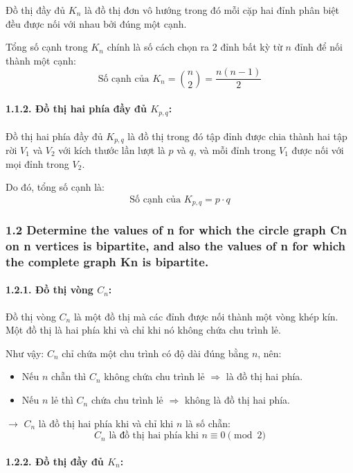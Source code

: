\documentclass{article}
\begin{document}
	Đồ thị đầy đủ \( K_n \) là đồ thị đơn vô hướng trong đó mỗi cặp hai đỉnh phân biệt đều được nối với nhau bởi đúng một cạnh.
	
	Tổng số cạnh trong \( K_n \) chính là số cách chọn ra 2 đỉnh bất kỳ từ \( n \) đỉnh để nối thành một cạnh:
	\[
	\text{Số cạnh của } K_n = \binom{n}{2} = \frac{n(n-1)}{2}
	\]
	
	\paragraph*{1.1.2. Đồ thị hai phía đầy đủ \( K_{p,q} \):}
	
	Đồ thị hai phía đầy đủ \( K_{p,q} \) là đồ thị trong đó tập đỉnh được chia thành hai tập rời \( V_1 \) và \( V_2 \) với kích thước lần lượt là \( p \) và \( q \), và mỗi đỉnh trong \( V_1 \) được nối với mọi đỉnh trong \( V_2 \).
	
	Do đó, tổng số cạnh là:
	\[
	\text{Số cạnh của } K_{p,q} = p \cdot q
	\]
	
	\subsubsection*{1.2 Determine the values of n for which the circle graph Cn on n vertices is bipartite,  and also the values of n for which the complete graph Kn is bipartite.}
	
	\paragraph*{1.2.1. Đồ thị vòng \( C_n \):}
	
	Đồ thị vòng \( C_n \) là một đồ thị mà các đỉnh được nối thành một vòng khép kín. Một đồ thị là hai phía khi và chỉ khi nó không chứa chu trình lẻ.
	
	Như vậy: \( C_n \) chỉ chứa một chu trình có độ dài đúng bằng \( n \), nên:
	\begin{itemize}
		\item Nếu \( n \) chẵn thì \( C_n \) không chứa chu trình lẻ \( \Rightarrow \) là đồ thị hai phía.
		\item Nếu \( n \) lẻ thì \( C_n \) chứa chu trình lẻ \( \Rightarrow \) không là đồ thị hai phía.
	\end{itemize}
	
	$\rightarrow$ \( C_n \) là đồ thị hai phía khi và chỉ khi \( n \) là số chẵn:
	\[
	\boxed{C_n \text{ là đồ thị hai phía khi } n \equiv 0 \pmod{2}}
	\]
	
	\paragraph*{1.2.2. Đồ thị đầy đủ \( K_n \):}
	
\end{document}
